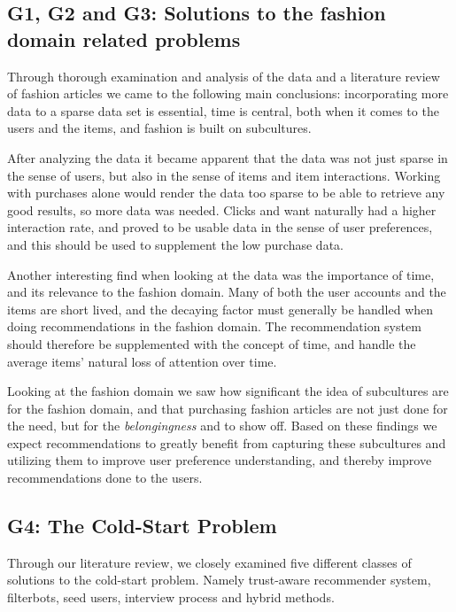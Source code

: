 \subsection{G1, G2 and G3: Solutions to the fashion domain related problems}
\label{sec:fashion-discussion}

Through thorough examination and analysis of the data and a literature review of fashion articles we came to the following main conclusions:
incorporating more data to a sparse data set is essential,
time is central, both when it comes to the users and the items,
and fashion is built on subcultures.

After analyzing the data it became apparent that the data was not just sparse in the sense of users, but also in the sense of items and item interactions.
Working with purchases alone would render the data too sparse to be able to retrieve any good results, so more data was needed.
Clicks and want naturally had a higher interaction rate, and proved to be usable data in the sense of user preferences, and this should be used to supplement the low purchase data.

Another interesting find when looking at the data was the importance of time, and its relevance to the fashion domain.
Many of both the user accounts and the items are short lived, and the decaying factor must generally be handled when doing recommendations in the fashion domain.
The recommendation system should therefore be supplemented with the concept of time, and handle the average items' natural loss of attention over time.

Looking at the fashion domain we saw how significant the idea of subcultures are for the fashion domain, and that purchasing fashion articles are not just done for the need, but for the \emph{belongingness} and to show off.
Based on these findings we expect recommendations to greatly benefit from capturing these subcultures and utilizing them to improve user preference understanding, and thereby improve recommendations done to the users.


\subsection{G4: The Cold-Start Problem}
\label{sec:cold-start-discussion}

Through our literature review, we closely examined five different classes of solutions to the cold-start problem. Namely trust-aware recommender system, filterbots, seed users, interview process and hybrid methods.

